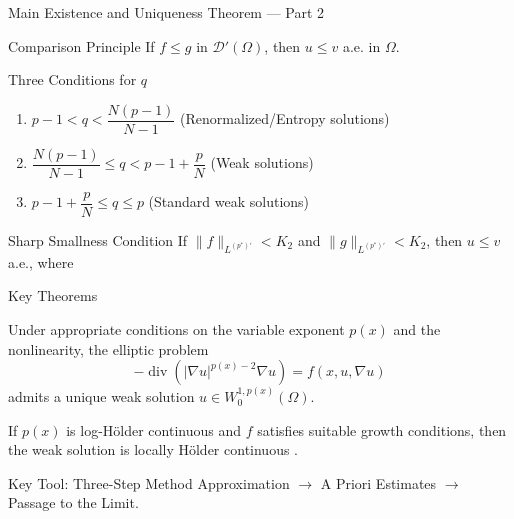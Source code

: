 \documentclass[11pt]{beamer}
\let\oldcite\cite
\renewcommand{\cite}[1]{\textcolor{red}{\textbf{\oldcite{#1}}}}
\begin{document}
	\begin{frame}{Main Existence and Uniqueness Theorem — Part 2 \cite{AlvinoFeroneMercaldo2025}}
		\begin{block}{Comparison Principle}
			\small
			If $f \le g$ in $\mathcal{D}'(\Omega)$, then $u \le v$ a.e. in $\Omega$.
		\end{block}
		
		\begin{block}{Three Conditions for $q$}
			\small
			\begin{enumerate}
				\item $p-1 < q < \dfrac{N(p-1)}{N-1}$ \quad (Renormalized/Entropy solutions)
				\item $\dfrac{N(p-1)}{N-1} \le q < p-1 + \dfrac{p}{N}$ \quad (Weak solutions)
				\item $p-1 + \dfrac{p}{N} \le q \le p$ \quad (Standard weak solutions)
			\end{enumerate}
		\end{block}
		
		\begin{block}{Sharp Smallness Condition}
			\small
			If $\|f\|_{L^{(p^*)'}} < K_2$ and $\|g\|_{L^{(p^*)'}} < K_2$, then $u \le v$ a.e., where
		\end{block}
	\end{frame}
	
	\begin{frame}{Key Theorems \cite{diening2011,chipot2000}}
		\begin{theorem}
			Under appropriate conditions on the variable exponent $p(x)$ and the nonlinearity, the elliptic problem
			\[
			-\operatorname{div}\left( |\nabla u|^{p(x)-2} \nabla u \right) = f(x, u, \nabla u)
			\]
			admits a unique weak solution $u \in W^{1, p(x)}_0(\Omega)$.
		\end{theorem}
		
		\begin{theorem}[Regularity]
			If $p(x)$ is log-Hölder continuous and $f$ satisfies suitable growth conditions, then the weak solution is locally Hölder continuous \cite{diening2011}.
		\end{theorem}
		
		\begin{block}{Key Tool: Three-Step Method \cite{boccardo1992}}
			Approximation $\to$ A Priori Estimates $\to$ Passage to the Limit.
		\end{block}
	\end{frame}
	
\end{document}
